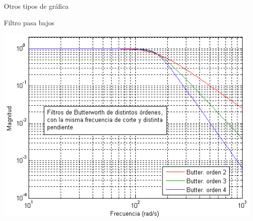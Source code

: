 \documentclass{bredelebeamer}
\begin{document}
\begin{frame}{Otros tipos de gráfica}
\begin{center}
Filtro pasa bajos
\end{center}
\begin{center}
\includegraphics[scale=0.5]{images/img41.png}
\end{center}
\end{frame}
\end{document}
